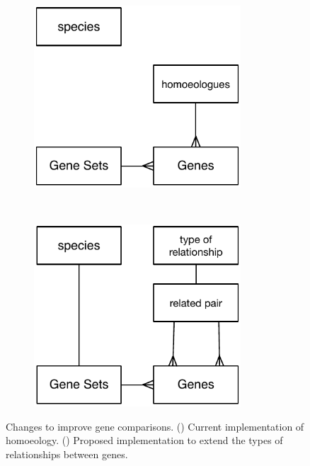 \begin{figure}
\centering
\begin{subfigure}{0.45\textwidth}
\centering
\caption{}
\label{fig:exp:currentGeneRelations}
\includegraphics[width=0.85\textwidth]{expVIP/Figures/currentGeneRelations.pdf}
\end{subfigure}
~
\begin{subfigure}{0.45\textwidth}
\centering
\caption{}
\label{fig:exp:futureGeneRelations}
\includegraphics[width=0.85\textwidth]{expVIP/Figures/futureGeneRelations.pdf}
\end{subfigure}
\caption[Changes to improve gene comparasions]{Changes to improve gene comparisons. () Current implementation of homoeology. () Proposed implementation to extend the types of relationships between genes.  }
\end{figure}

